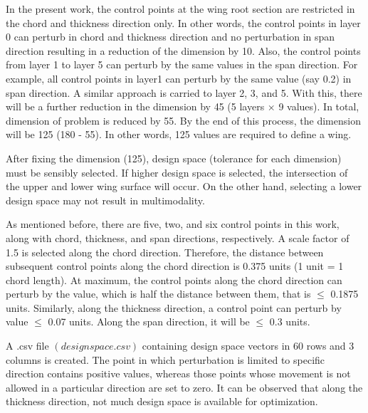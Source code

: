 In the present work, the control points at the wing root section are restricted in the chord and thickness direction only. In other words, the control points in layer 0 can perturb in chord and thickness direction and no perturbation in span direction resulting in a reduction of the dimension by 10. Also, the control points from layer 1 to layer 5 can perturb by the same values in the span direction. For example, all control points in layer1 can perturb by the same value (say 0.2) in span direction. A similar approach is carried to layer 2, 3,  and 5. With this, there will be a further reduction in the dimension by 45 (5 layers $\times$ 9 values). In total, dimension of problem is reduced by 55. By the end of this process, the dimension will be 125 (180 - 55). In other words, 125 values are required to define a wing. 

After fixing the dimension (125), design space (tolerance for each dimension) must be sensibly selected. If higher design space is selected, the intersection of the upper and lower wing surface will occur. On the other hand, selecting a lower design space may not result in multimodality. 

As mentioned before, there are five, two, and six control points in this work, along with chord, thickness, and span directions, respectively. A scale factor of 1.5 is selected along the chord direction. Therefore, the distance between subsequent control points along the chord direction is 0.375 units (1 unit = 1 chord length). At maximum, the control points along the chord direction can perturb by the value, which is half the distance between them, that is $\leq$ 0.1875 units. Similarly, along the thickness direction, a control point can perturb by value $\leq$ 0.07 units. Along the span direction, it will be $\leq$ 0.3 units. 

A .csv file $(design space.csv)$ containing design space vectors in 60 rows and 3 columns is created. The point in which perturbation is limited to specific direction contains positive values, whereas those points whose movement is not allowed in a particular direction are set to zero. It can be observed that along the thickness direction, not much design space is available for optimization.

